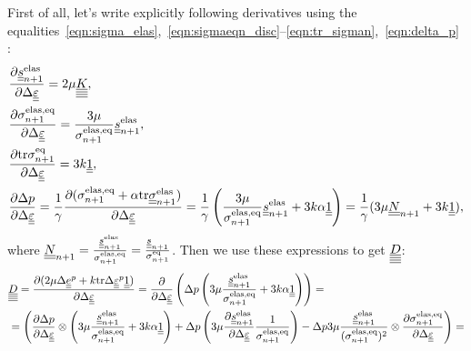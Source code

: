 \documentclass[12pt]{article}
\begin{document}
\begin{appendices}
    First of all, let's write explicitly following derivatives using the equalities~\eqref{eqn:sigma_elas},~\eqref{eqn:sigmaeqn_disc}--\eqref{eqn:tr_sigman},~\eqref{eqn:delta_p} :
    \begin{align}
        & \frac{\partial \underline{\underline{s}}_{n+1}^\text{elas}{}}{\partial \Delta\underline{\underline{\varepsilon}}} = 2\mu \underline{\underline{\underline{\underline{K}}}}, \\
        & \frac{\partial \sigma_{n+1}^\text{elas,eq}{}}{\partial \Delta\underline{\underline{\varepsilon}}} = \frac{3\mu}{\sigma_{n+1}^\text{elas,eq}}\underline{\underline{s}}_{n+1}^\text{elas}, \\
        & \frac{\partial\mathrm{tr}\sigma_{n+1}^\text{eq}}{\partial\Delta\underline{\underline{\varepsilon}}} = 3k\underline{\underline{1}}, \\
        & \frac{\partial\Delta p}{\partial\Delta\underline{\underline{\varepsilon}}} = \frac{1}{\gamma} \frac{\partial(\sigma_{n+1}^\text{elas,eq} + \alpha \mathrm{tr} \underline{\underline{\sigma}}_{n+1}^{\text{elas}})}{\partial\Delta\underline{\underline{\varepsilon}}} = \frac{1}{\gamma} \left( \frac{3\mu}{\sigma_{n+1}^\text{elas,eq}}\underline{\underline{s}}_{n+1}^\text{elas} + 3k\alpha\underline{\underline{1}} \right) = \frac{1}{\gamma}(3\mu \underline{\underline{N}}_{n+1} + 3k\underline{\underline{1}}),
    \end{align}
    where $\underline{\underline{N}}_{n+1} = \frac{\underline{\underline{s}}^\text{elas}_{n+1}}{\sigma_{n+1}^\text{elas,eq}} = \frac{\underline{\underline{s}}_{n+1}}{\sigma_{n+1}^\text{eq}}$.
    Then we use these expressions to get $\underline{\underline{\underline{\underline{D}}}}$:
    \begin{align*}
        & \uuuuD = \frac{\partial (2\mu\Delta\uue^p + k\mtr\Delta\uueps^p\uuUnit)}{\partial\Delta\uueps} = \frac{\partial }{\partial \Delta\uueps} \left( \Delta p \left( 3\mu \frac{\uusnelas}{\sigmaeqnelas} + 3k\alpha \uuUnit  \right) \right) = \\
        & = \left( \frac{\partial\Delta p}{\partial\Delta\uueps} \otimes \left( 3\mu\frac{\uusnelas}{\sigmaeqnelas} + 3k\alpha \uuUnit \right) + \Delta p \left(3\mu\frac{\partial\uusnelas}{\partial\Delta\uueps}\frac{1}{\sigmaeqnelas} \right) - \Delta p 3\mu\frac{\uusnelas}{(\sigmaeqnelas)^2} \otimes \frac{\partial\sigmaeqnelas}{\partial\Delta\uueps}\right) = \\

\end{align*}
\end{appendices}
\end{document}

